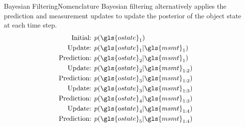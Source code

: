 \documentclass{beamer}
\begin{document}
\begin{frame}{Bayesian Filtering}{Nomenclature}
	Bayesian filtering alternatively applies the prediction and measurement updates to update the posterior of the object state at each time step.
	\begin{align}
		\text{Initial: }&p(\gls{ostate}_1)\nonumber\\
		\text{Update: }&p(\gls{ostate}_1 | \gls{msmt}_1)\nonumber\\
		\text{Prediction: }&p(\gls{ostate}_2 | \gls{msmt}_1)\nonumber\\
		\text{Update: }&p(\gls{ostate}_2 | \gls{msmt}_{1:2})\nonumber\\
		\text{Prediction: }&p(\gls{ostate}_3 | \gls{msmt}_{1:2})\nonumber\\
		\text{Update: }&p(\gls{ostate}_3 | \gls{msmt}_{1:3})\nonumber\\
		\text{Prediction: }&p(\gls{ostate}_4 | \gls{msmt}_{1:3})\nonumber\\
		\text{Update: }&p(\gls{ostate}_4 | \gls{msmt}_{1:4})\nonumber\\
		\text{Prediction: }&p(\gls{ostate}_5 | \gls{msmt}_{1:4})\nonumber
	\end{align}
\end{frame}
\end{document}
